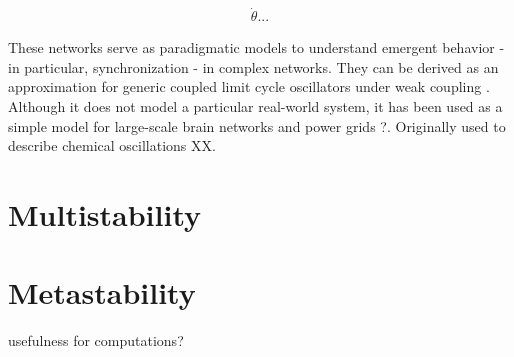 \begin{align}
    \dot{\theta} ...
\end{align}

These networks serve as paradigmatic models to understand emergent behavior - in particular, synchronization - in complex networks. They can be derived as an approximation for generic coupled limit cycle oscillators under weak coupling \cite{}. Although it does not model a particular real-world system, it has been used as a simple model for large-scale brain networks \cite{} and power grids \cite{} ?. Originally used to describe chemical oscillations XX.




\section[multistability]{Multistability}


\section[metastability]{Metastability}


usefulness for computations?